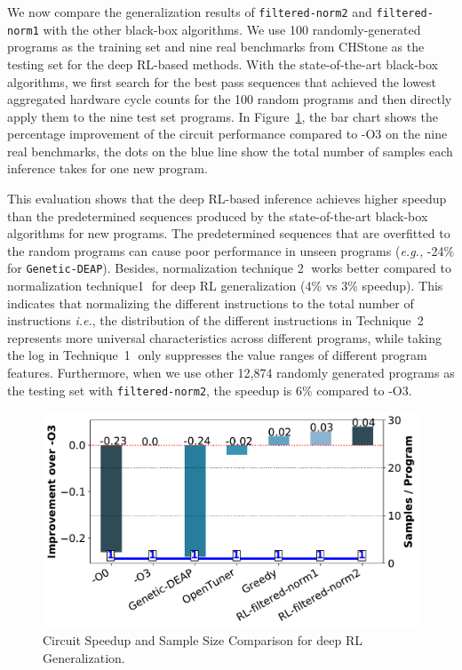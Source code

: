We now compare the generalization results of \texttt{filtered-norm2} and \texttt{filtered-norm1} with the other black-box algorithms. We use 100 randomly-generated programs as the training set and nine real benchmarks from CHStone as the testing set for the deep RL-based methods.
With the state-of-the-art black-box algorithms, we first search for the best pass sequences that achieved the lowest aggregated hardware cycle counts for the 100 random programs and then directly apply them to the nine test set programs.   
In Figure~\ref{fig:train_result_generalization}, the bar chart shows the percentage improvement of the circuit performance compared to -O3 on the nine real benchmarks, the dots on the blue line show the total number of samples each inference takes for one new program.

This evaluation shows that the deep RL-based inference achieves higher speedup than the predetermined sequences produced by the state-of-the-art black-box algorithms for new programs. The predetermined sequences that are overfitted to the random programs can cause poor performance in unseen programs (\textit{e.g.,} -24\% for \texttt{Genetic-DEAP}).  
Besides, normalization technique \textcircled{2} works better compared to normalization technique\textcircled{1} for deep RL generalization (4\% vs 3\% speedup).
This indicates that normalizing the different instructions to the total number of instructions \textit{i.e.}, the distribution of the different instructions in Technique~\textcircled{2} represents more universal characteristics across different programs, 
while taking the log in Technique~\textcircled{1} only suppresses the value ranges of different program features. Furthermore, when we use other 12,874 randomly generated programs as the testing set with \texttt{filtered-norm2}, the speedup is 6\% compared to -O3.

\begin{figure}[!t]
    \centering
    \includegraphics[width=1\linewidth]{Figures/train_result_generalization.pdf}
    \vspace{-0.5cm}
    \caption{Circuit Speedup and Sample Size Comparison for deep RL Generalization.}
    \label{fig:train_result_generalization}
\end{figure} 


